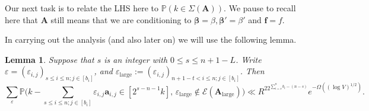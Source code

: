 \documentclass[11pt,reqno]{amsart}
\numberwithin{equation}{section}
\newtheorem{lemma}[theorem]{Lemma}
\theoremstyle{definition}
\theoremstyle{remark}
\newcommand{\mb}{\mathbb}
\newcommand{\mbf}{\mathbf}
\newcommand{\eps}{\varepsilon}
\def\boldbeta{\boldsymbol\beta}
\renewcommand{\le}{\leqslant}
\def\lrg{\operatorname{large}}
\begin{document}
   
Our next task is to relate the LHS here to $\mb{P}(k \in \Sigma(\mbf{A}))$. We pause to recall here that $\mbf{A}$ still means that we are conditioning to $\boldbeta = \beta, \boldbeta' = \beta'$ and $\mbf{f} = f$. 

In carrying out the analysis (and also later on) we will use the following lemma.
\begin{lemma}\label{claim3-lem}
Suppose that $s$ is an integer with $0 \le s \le n +1 - L$. Write $\eps = (\eps_{i,j})_{s \le i \le n; j \in [b_i]}$, and $\eps_{\lrg} := (\eps_{i,j})_{n + 1 - t <i \le n; j \in [b_i]}$. Then
\[ \sum_{\eps} \mb{P} \big(k - \sum_{s \le i \le n; j \in [b_i]} \eps_{i,j} \mathbf{a}_{i,j} \in [2^{s - n - 1} k], \, \eps_{\lrg} \notin \mathcal{E}(\mbf{A}_{\lrg})\big) \ll R^22^{\sum_{i = s}^n b_i - (n - s)} e^{-\Omega((\log V)^{1/2})}. \]
\end{lemma}
\end{document}
